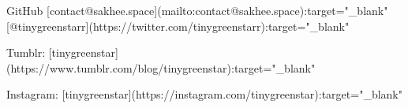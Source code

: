 
GitHub
[contact@sakhee.space](mailto:contact@sakhee.space){:target="_blank"}
[@tinygreenstarr](https://twitter.com/tinygreenstarr){:target="_blank"}

Tumblr:
[tinygreenstar](https://www.tumblr.com/blog/tinygreenstar){:target="_blank"}

Instagram:
[tinygreenstar](https://instagram.com/tinygreenstar){:target="_blank"}